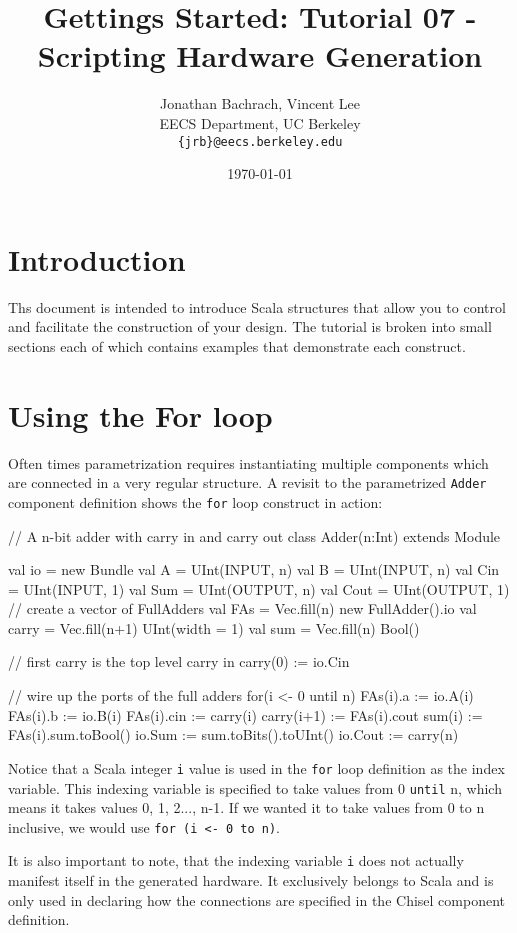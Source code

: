 \documentclass[twocolumn, 10pt]{article}
\title{Gettings Started: Tutorial 07 - Scripting Hardware Generation}
\author{Jonathan Bachrach, Vincent Lee \\
EECS Department, UC Berkeley\\
{\tt  \{jrb\}@eecs.berkeley.edu}
}
\date{\today}
\begin{document}
\maketitle{}

\section{Introduction}

Ths document is intended to introduce Scala structures that allow you to control and facilitate the construction of your design. The tutorial is broken into small sections each of which contains examples that demonstrate each construct.

\section{Using the For loop}

Often times parametrization requires instantiating multiple components which are connected in a very regular structure. A revisit to the parametrized \verb+Adder+ component definition shows the \verb+for+ loop construct in action:

\begin{scala}
// A n-bit adder with carry in and carry out
class Adder(n:Int) extends Module {
  val io = new Bundle {
    val A    = UInt(INPUT, n)
    val B    = UInt(INPUT, n)
    val Cin  = UInt(INPUT, 1)
    val Sum  = UInt(OUTPUT, n)
    val Cout = UInt(OUTPUT, 1)
  }
  // create a vector of FullAdders
  val FAs   = Vec.fill(n){ new FullAdder().io }
  val carry = Vec.fill(n+1){ UInt(width = 1) }
  val sum   = Vec.fill(n){ Bool() }

  // first carry is the top level carry in
  carry(0) := io.Cin

  // wire up the ports of the full adders
  for(i <- 0 until n) {
     FAs(i).a   := io.A(i)
     FAs(i).b   := io.B(i)
     FAs(i).cin := carry(i)
     carry(i+1) := FAs(i).cout
     sum(i)     := FAs(i).sum.toBool()
  }
  io.Sum  := sum.toBits().toUInt()
  io.Cout := carry(n)
}
\end{scala}

Notice that a Scala integer \verb+i+ value is used in the \verb+for+ loop definition as the index variable. This indexing variable is specified to take values from 0 \verb+until+ n, which means it takes values 0, 1, 2..., n-1. If we wanted it to take values from 0 to n inclusive, we would use \verb+for (i <- 0 to n)+.

It is also important to note, that the indexing variable \verb+i+ does not actually manifest itself in the generated hardware. It exclusively belongs to Scala and is only used in declaring how the connections are specified in the Chisel component definition.
\end{document}
